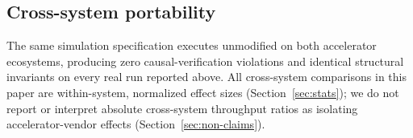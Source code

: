 \subsection{Cross-system portability}
\label{sec:portability}

The same simulation specification executes unmodified on both accelerator ecosystems, producing zero causal-verification violations and identical structural invariants on every real run reported above. All cross-system comparisons in this paper are within-system, normalized effect sizes (Section~\ref{sec:stats}); we do not report or interpret absolute cross-system throughput ratios as isolating accelerator-vendor effects (Section~\ref{sec:non-claims}).
